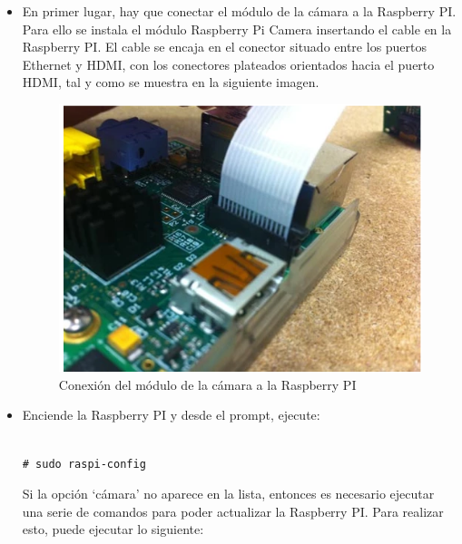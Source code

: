 \begin{itemize}

\item  En primer lugar, hay que conectar el módulo de la cámara a la Raspberry PI. Para ello se instala el módulo Raspberry Pi Camera insertando el cable en la Raspberry PI. El cable se encaja en el conector situado entre los puertos Ethernet y HDMI, con los conectores plateados orientados hacia el puerto HDMI, tal y como se muestra en la siguiente imagen.


\begin{figure}[H]
	\centering
	\includegraphics[scale=0.45]{images/46}
	\caption{Conexión del módulo de la cámara a la Raspberry PI}
\end{figure}

\item Enciende la Raspberry PI y desde el prompt, ejecute:

\vspace{-1cm}

\begin{verbatim}

# sudo raspi-config

\end{verbatim}

\vspace{-1cm}

Si la opción `cámara' no aparece en la lista, entonces es necesario ejecutar una serie de comandos para poder actualizar la Raspberry PI. Para realizar esto, puede ejecutar lo siguiente:

\vspace{-1cm}


\end{itemize}
